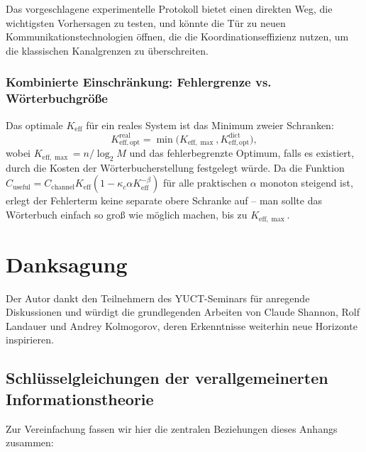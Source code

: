 \documentclass[12pt,a4paper]{article}
\theoremstyle{remark}
\newcommand{\Keff}{K_{\mathrm{eff}}}
\newcommand{\Keffopt}{K_{\mathrm{eff},\mathrm{opt}}}
\newcommand{\Keffmax}{K_{\mathrm{eff},\max}}
\begin{document}
	Das vorgeschlagene experimentelle Protokoll bietet einen direkten Weg, die wichtigsten Vorhersagen zu testen, und könnte die Tür zu neuen Kommunikationstechnologien öffnen, die die Koordinationseffizienz nutzen, um die klassischen Kanalgrenzen zu überschreiten.
	
	\subsubsection{Kombinierte Einschränkung: Fehlergrenze vs. Wörterbuchgröße}
	Das optimale $\Keff$ für ein reales System ist das Minimum zweier Schranken:
	\[
	\Keffopt^{\text{real}} = \min\bigl( \Keffmax, \Keffopt^{\text{dict}} \bigr),
	\]
	wobei $\Keffmax = n / \log_2 M$ und das fehlerbegrenzte Optimum, falls es existiert, durch die Kosten der Wörterbucherstellung festgelegt würde. Da die Funktion $C_{\text{useful}} = C_{\text{channel}} \Keff (1 - \kappa_c\alpha K_{\mathrm{eff}}^{-\beta})$ für alle praktischen $\alpha$ monoton steigend ist, erlegt der Fehlerterm keine separate obere Schranke auf – man sollte das Wörterbuch einfach so groß wie möglich machen, bis zu $\Keffmax$.
	
	\section*{Danksagung}
	
	Der Autor dankt den Teilnehmern des YUCT-Seminars für anregende Diskussionen und würdigt die grundlegenden Arbeiten von Claude Shannon, Rolf Landauer und Andrey Kolmogorov, deren Erkenntnisse weiterhin neue Horizonte inspirieren.
	
	\subsection*{Schlüsselgleichungen der verallgemeinerten Informationstheorie}
	Zur Vereinfachung fassen wir hier die zentralen Beziehungen dieses Anhangs zusammen:
	
\end{document}

